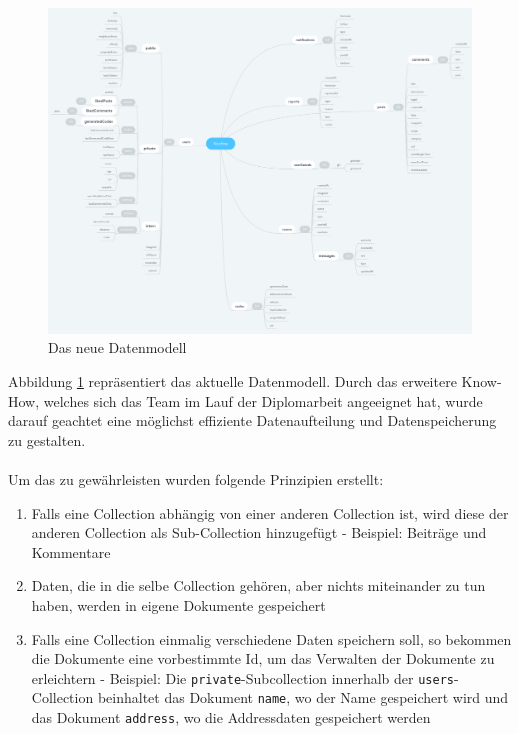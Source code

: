 \begin{figure}[H]
  \centering
  \includegraphics[width=1\textwidth]{pics/nochba-erd-new.png}
  \caption{Das neue Datenmodell}
  \label{fig:new-erd}
\end{figure}

Abbildung \ref{fig:new-erd} repräsentiert das aktuelle Datenmodell. Durch das erweitere Know-How, welches sich das Team im Lauf der Diplomarbeit angeeignet hat, wurde darauf geachtet eine möglichst effiziente Datenaufteilung und Datenspeicherung zu gestalten.
\\\\
Um das zu gewährleisten wurden folgende Prinzipien erstellt:
\begin{enumerate}
  \item Falls eine Collection abhängig von einer anderen Collection ist, wird diese der anderen Collection als Sub-Collection hinzugefügt - Beispiel: Beiträge und Kommentare
  \item Daten, die in die selbe Collection gehören, aber nichts miteinander zu tun haben, werden in eigene Dokumente gespeichert
  \item Falls eine Collection einmalig verschiedene Daten speichern soll, so bekommen die Dokumente eine vorbestimmte Id, um das Verwalten der Dokumente zu erleichtern - Beispiel: Die \texttt{private}-Subcollection innerhalb der \texttt{users}-Collection beinhaltet das Dokument \texttt{name}, wo der Name gespeichert wird und das Dokument \texttt{address}, wo die Addressdaten gespeichert werden

\end{enumerate}

